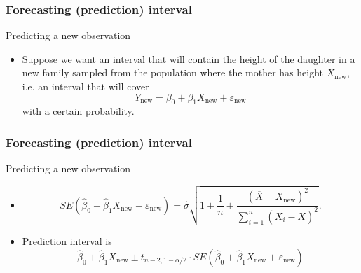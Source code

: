 \documentclass[handout]{beamer}
\begin{document}

   \begin{frame} \frametitle{Forecasting (prediction) interval}

   \begin{block}
   {Predicting a new observation}
   \begin{itemize}[<+->]

   \item Suppose we want an interval that will contain
   the height of the daughter in a new family sampled from the population
   where the mother has height $X_{\text{new}}$, i.e. an
   interval that will cover
   $$
   Y_{\text{new}} = \beta_0 + \beta_1 X_{\text{new}} + \varepsilon_{\text{new}}$$
   with a certain probability.
   \end{itemize}
   \end{block}
   \end{frame}


   \begin{frame} \frametitle{Forecasting (prediction) interval}

   \begin{block}
   {Predicting a new observation}
   \begin{itemize}[<+->]

   \item
   $$
   SE(\widehat{\beta}_0 + \widehat{\beta}_1 X_{\text{new}} + \varepsilon_{\text{new}}) = \widehat{\sigma} \sqrt{1 + \frac{1}{n} + \frac{(\overline{X} - X_{\text{new}})^2}{\sum_{i=1}^n \left(X_i-\overline{X}\right)^2}}.$$

   \item Prediction interval  is
   $$ \widehat{\beta}_0 +  \widehat{\beta}_1 X_{\text{new}} \pm t_{n-2, 1-\alpha/2} \cdot SE(\widehat{\beta}_0 + \widehat{\beta}_1 X_{\text{new}} + \varepsilon_{\text{new}})
   $$
   \end{itemize}
   \end{block}
   \end{frame}


   \begin{frame} 

   \end{frame}

   
\end{document}
